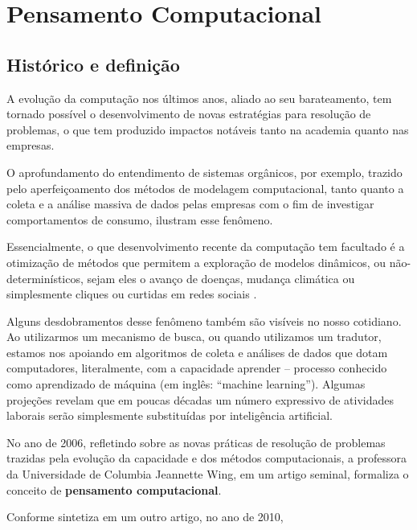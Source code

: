 \chapter{Pensamento Computacional}\label{pensamento-computacional}


\section{Histórico e definição}

A evolução da computação nos últimos anos, aliado ao seu barateamento, tem tornado possível o desenvolvimento de novas estratégias para resolução de problemas, o que tem produzido impactos notáveis tanto na academia quanto nas empresas.

O aprofundamento do entendimento de sistemas orgânicos, por exemplo, trazido pelo aperfeiçoamento dos métodos de modelagem computacional, tanto quanto a coleta e a análise massiva de dados pelas empresas com o fim de investigar comportamentos de consumo, ilustram esse fenômeno.

Essencialmente, o que desenvolvimento recente da computação tem facultado é a otimização de métodos que permitem a exploração de modelos dinâmicos, ou não-determinísticos, sejam eles o avanço de doenças, mudança climática ou simplesmente cliques ou curtidas em redes sociais \cite{weintrop}.

Alguns desdobramentos desse fenômeno também são visíveis no nosso cotidiano. Ao utilizarmos um mecanismo de busca, ou quando utilizamos um tradutor, estamos nos apoiando em algoritmos de coleta e análises de dados que dotam computadores, literalmente, com a capacidade aprender -- processo conhecido como aprendizado de máquina (em inglês: ``machine learning''). Algumas projeções revelam que em poucas décadas um número expressivo de atividades laborais serão simplesmente substituídas por inteligência artificial. %

No ano de 2006, refletindo sobre as novas práticas de resolução de problemas trazidas pela evolução da capacidade e dos métodos computacionais, a professora da Universidade de Columbia Jeannette Wing, em um artigo seminal, formaliza o conceito de \textbf{pensamento computacional}.


Conforme sintetiza em um outro artigo, no ano de 2010,


